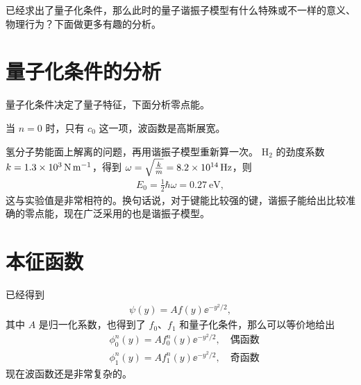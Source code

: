 已经求出了量子化条件，那么此时的量子谐振子模型有什么特殊或不一样的意义、物理行为？下面做更多有趣的分析。

\section{量子化条件的分析}

量子化条件决定了量子特征，下面分析零点能。


当 $n=0$ 时，只有 $c_0$ 这一项，波函数是高斯展宽。

氢分子势能面上解离的问题，再用谐振子模型重新算一次。
$\mathrm H_2$ 的劲度系数 $k = \SI{1.3E3}{\newton\per\metre}$，得到 $\omega = \sqrt{\frac km} = \SI{8.2E14}{\hertz}$，则
\begin{eqnarray}
    E_0 = \frac 12 \hbar \omega = \SI{0.27}{\electronvolt}, 
\end{eqnarray}
这与实验值是非常相符的。换句话说，对于键能比较强的键，谐振子能给出比较准确的零点能，现在广泛采用的也是谐振子模型。

\section{本征函数}
已经得到
\begin{align}
    \psi(y) = A f(y) \ee^{-y^2/2},
\end{align}
其中 $A$ 是归一化系数，也得到了 $f_0$、$f_1$ 和量子化条件，那么可以等价地给出
\begin{align}
    &\phi_0^n (y) = A f_0^n (y) \ee^{-y^2/2}, \quad\text{偶函数}\\
    &\phi_1^n (y) = A f_1^n (y) \ee^{-y^2/2}, \quad\text{奇函数}
\end{align}
现在波函数还是非常复杂的。

